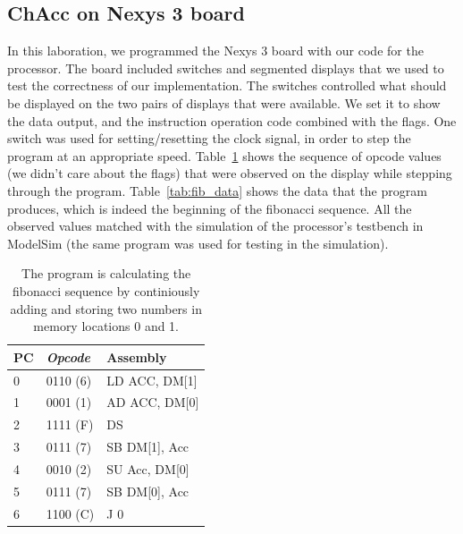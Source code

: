 \documentclass[a4,11pt]{article}
\begin{document}
\subsection{ChAcc on Nexys 3 board}

In this laboration, we programmed the Nexys 3 board with our code for the processor. The board
included switches and segmented displays that we used to test the correctness of our implementation.
The switches controlled what should be displayed on the two pairs of displays that were available.
We set it to show the data output, and the instruction operation code combined with the flags.
One switch was used for setting/resetting the clock signal, in order to step the program at an
appropriate speed. Table~\ref{tab:fib} shows the sequence of opcode values (we didn't care about
the flags) that were observed on the display while stepping through the program.
Table~\ref{tab:fib_data} shows the data that the program produces, which is indeed the beginning
of the fibonacci sequence. All the observed values matched with the simulation of the processor's
testbench in ModelSim (the same program was used for testing in the simulation).
   
\begin{table}   
	\centering
	\small
	\def\arraystretch{1.1}              
	\begin{tabular}{|l|l|l|}
		\hline
		PC & {\it Opcode}    & {\bf Assembly} \\ \hline
		0  & 0110 (6)        & LD ACC, DM[1]  \\
    1  & 0001 (1)        & AD ACC, DM[0]  \\
    2  & 1111 (F)        & DS             \\
    3  & 0111 (7)        & SB DM[1], Acc  \\
    4  & 0010 (2)        & SU Acc, DM[0]  \\
    5  & 0111 (7)        & SB DM[0], Acc  \\
    6  & 1100 (C)        & J 0            \\ \hline
	\end{tabular}
	\caption{The program is calculating the fibonacci sequence by continiously adding and storing
           two numbers in memory locations 0 and 1.}
	\label{tab:fib}
\end{table}
\end{document}
